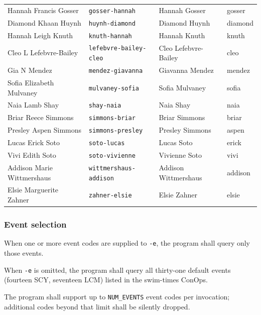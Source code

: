 \documentclass[12pt]{article}
\newcommand{\code}[1]{\texttt{#1}}
\newcommand{\req}[1]{\textbf{[#1]}}
\begin{document}
\begin{longtable}{@{}l l l l@{}}
  Hannah Francis Gosser   & \code{gosser-hannah}       & Hannah Gosser        & gosser \\
  Diamond Khaan Huynh     & \code{huynh-diamond}       & Diamond Huynh        & diamond \\
  Hannah Leigh Knuth      & \code{knuth-hannah}        & Hannah Knuth         & knuth \\
  Cleo L Lefebvre-Bailey  & \code{lefebvre-bailey-cleo}& Cleo Lefebvre-Bailey & cleo \\
  Gia N Mendez            & \code{mendez-giavanna}     & Giavanna Mendez      & mendez \\
  Sofia Elizabeth Mulvaney& \code{mulvaney-sofia}      & Sofia Mulvaney       & sofia \\
  Naia Lamb Shay          & \code{shay-naia}           & Naia Shay            & naia \\
  Briar Reece Simmons     & \code{simmons-briar}       & Briar Simmons        & briar \\
  Presley Aspen Simmons   & \code{simmons-presley}     & Presley Simmons      & aspen \\
  Lucas Erick Soto        & \code{soto-lucas}          & Lucas Soto           & erick \\
  Vivi Edith Soto         & \code{soto-vivienne}       & Vivienne Soto        & vivi \\
  Addison Marie Wittmershaus & \code{wittmershaus-addison}& Addison Wittmershaus & addison \\
  Elsie Marguerite Zahner & \code{zahner-elsie}        & Elsie Zahner         & elsie \\
\end{longtable}

\subsubsection{Event selection}

\begin{description}[style=nextline]
  \item[\req{REQ-F-20}] When one or more event codes are supplied
        to \code{-e}, the program shall query only those events.
  \item[\req{REQ-F-21}] When \code{-e} is omitted, the program
        shall query all thirty-one default events
        (fourteen SCY, seventeen LCM) listed in the swim-times ConOps.
  \item[\req{REQ-F-22}] The program shall support up to
        \code{NUM\_EVENTS} event codes per invocation; additional
        codes beyond that limit shall be silently dropped.
\end{description}
\end{document}
